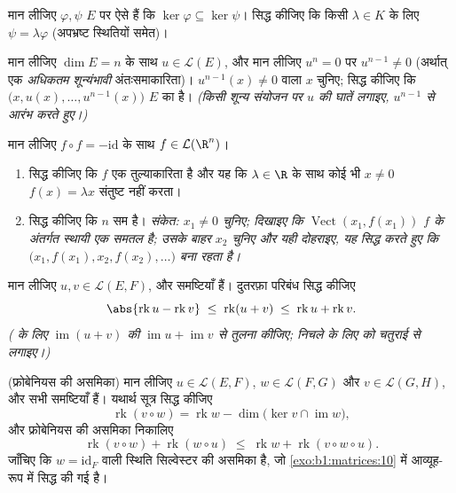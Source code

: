 \begin{exercise}[$\star\star$]\label{exo:b1:linmaps:8}
मान लीजिए $\varphi, \psi$ $E$ पर ऐसे  हैं कि $\ker\varphi \subseteq
\ker\psi$। सिद्ध कीजिए कि किसी $\lambda \in K$ के लिए $\psi =
\lambda\varphi$ (अपभ्रष्ट स्थितियों समेत)।
\end{exercise}

\begin{exercise}[$\star\star\star$]\label{exo:b1:linmaps:9}
मान लीजिए $\dim E = n$ के साथ $u \in \mathcal{L}(E)$, और मान लीजिए $u^n = 0$
पर $u^{n-1} \neq 0$ (अर्थात् एक \emph{अधिकतम शून्यंभावी} अंतःसमाकारिता)।
$u^{n-1}(x) \neq 0$ वाला $x$ चुनिए; सिद्ध कीजिए कि $\bigl(x, u(x), \dots,
u^{n-1}(x)\bigr)$ $E$ का  है। \emph{(किसी शून्य संयोजन पर $u$ की घातें
लगाइए, $u^{n-1}$ से आरंभ करते हुए।)}
\end{exercise}

\begin{exercise}[$\star\star\star$]\label{exo:b1:linmaps:10}
मान लीजिए $f \circ f = -\mathrm{id}$ के साथ $f \in \mathcal{L}(\R^n)$।
\begin{enumerate}
  \item सिद्ध कीजिए कि $f$ एक तुल्याकारिता है और यह कि $\lambda \in \R$ के
  साथ कोई भी $x \neq 0$ $f(x) = \lambda x$ संतुष्ट नहीं करता।
  \item सिद्ध कीजिए कि $n$ सम है। \emph{संकेत: $x_1 \neq 0$ चुनिए; दिखाइए कि
  $\operatorname{Vect}(x_1, f(x_1))$ $f$ के अंतर्गत स्थायी एक समतल है; उसके
  बाहर $x_2$ चुनिए और यही दोहराइए, यह सिद्ध करते हुए कि $\bigl(x_1, f(x_1),
  x_2, f(x_2), \dots\bigr)$  बना रहता है।}
\end{enumerate}
\end{exercise}

\begin{exercise}[$\star\star$]\label{exo:b1:linmaps:11}
मान लीजिए $u, v \in \mathcal{L}(E, F)$, और समष्टियाँ  हैं।
दुतरफ़ा परिबंध सिद्ध कीजिए
\[
\abs{\operatorname{rk} u - \operatorname{rk} v}
\;\leq\; \operatorname{rk}(u + v)
\;\leq\; \operatorname{rk} u + \operatorname{rk} v .
\]
\emph{( के लिए $\operatorname{im}(u+v)$ की $\operatorname{im} u +
\operatorname{im} v$ से तुलना कीजिए; निचले के लिए  को चतुराई से
लगाइए।)}
\end{exercise}

\begin{exercise}[$\star\star\star$]\label{exo:b1:linmaps:12}
(फ्रोबेनियस की असमिका) मान लीजिए $u \in \mathcal{L}(E, F)$, $w \in
\mathcal{L}(F, G)$ और $v \in \mathcal{L}(G, H)$, और सभी समष्टियाँ
 हैं। यथार्थ सूत्र सिद्ध कीजिए
\[
\operatorname{rk}(v \circ w) = \operatorname{rk} w -
\dim\bigl(\ker v \cap \operatorname{im} w\bigr),
\]
और फ्रोबेनियस की असमिका निकालिए
\[
\operatorname{rk}(v \circ w) + \operatorname{rk}(w \circ u)
\;\leq\; \operatorname{rk} w + \operatorname{rk}(v \circ w \circ
u) .
\]
जाँचिए कि $w = \mathrm{id}_F$ वाली स्थिति सिल्वेस्टर की असमिका है, जो
\cref{exo:b1:matrices:10} में आव्यूह-रूप में सिद्ध की गई है।
\end{exercise}

